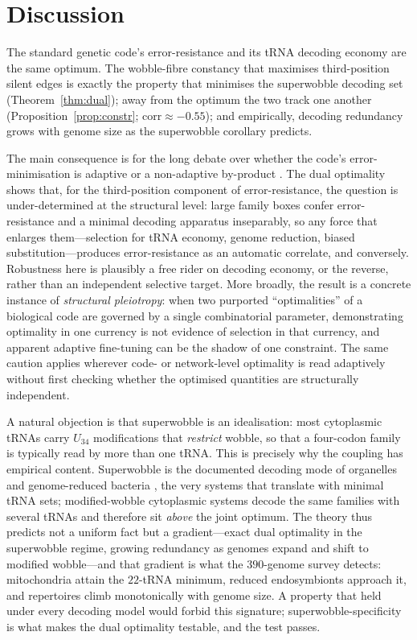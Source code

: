 \documentclass[11pt]{article}
\theoremstyle{remark}
\begin{document}
\section{Discussion}

The standard genetic code's error-resistance and its tRNA decoding economy are
the same optimum. The wobble-fibre constancy that maximises third-position
silent edges is exactly the property that minimises the superwobble decoding
set (Theorem~\ref{thm:dual}); away from the optimum the two track one another
(Proposition~\ref{prop:constr}; $\mathrm{corr}\approx-0.55$); and empirically,
decoding redundancy grows with genome size as the superwobble corollary predicts.

The main consequence is for the long debate over whether the code's
error-minimisation is adaptive \cite{freeland,haig} or a non-adaptive by-product
\cite{massey,koonin}. The dual optimality shows that, for the third-position
component of error-resistance, the question is under-determined at the structural
level: large family boxes confer error-resistance and a minimal decoding
apparatus inseparably, so any force that enlarges them---selection for tRNA
economy, genome reduction, biased substitution---produces error-resistance as an
automatic correlate, and conversely. Robustness here is plausibly a free rider on
decoding economy, or the reverse, rather than an independent selective target.
More broadly, the result is a concrete instance of \emph{structural pleiotropy}:
when two purported ``optimalities'' of a biological code are governed by a single
combinatorial parameter, demonstrating optimality in one currency is not evidence
of selection in that currency, and apparent adaptive fine-tuning can be the
shadow of one constraint. The same caution applies wherever code- or
network-level optimality is read adaptively without first checking whether the
optimised quantities are structurally independent.

A natural objection is that superwobble is an idealisation: most cytoplasmic
tRNAs carry $U_{34}$ modifications that \emph{restrict} wobble, so that a
four-codon family is typically read by more than one tRNA. This is precisely why
the coupling has empirical content. Superwobble is the documented decoding mode
of organelles and genome-reduced bacteria \cite{rogalski,agris}, the very systems
that translate with minimal tRNA sets; modified-wobble cytoplasmic systems decode
the same families with several tRNAs and therefore sit \emph{above} the joint
optimum. The theory thus predicts not a uniform fact but a gradient---exact dual
optimality in the superwobble regime, growing redundancy as genomes expand and
shift to modified wobble---and that gradient is what the $390$-genome survey
detects: mitochondria attain the $22$-tRNA minimum, reduced endosymbionts
approach it, and repertoires climb monotonically with genome size. A property
that held under every decoding model would forbid this signature;
superwobble-specificity is what makes the dual optimality testable, and the test
passes.
\end{document}
